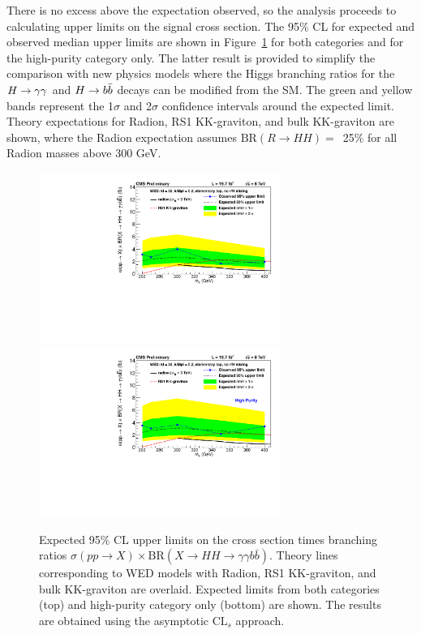 There is no excess above the expectation observed, so the analysis proceeds to calculating
upper limits on the signal cross section.
The 95\% CL for expected and observed median upper limits are shown in
Figure~\ref{fig:limits_lowmassres} for both categories and for the high-purity category only.
The latter result is provided to simplify the comparison with new physics models where
the Higgs branching ratios for the $H\to\gamma\gamma$ and $H\to b\bar{b}$ decays can be modified from the SM.
The green and yellow bands represent the 1$\sigma$ and 2$\sigma$
confidence intervals around the expected limit. Theory expectations for Radion, RS1 KK-graviton, and 
bulk KK-graviton are shown, where the Radion expectation assumes $\text{BR}(R\rightarrow HH) =$~25\%
for all Radion masses above 300 GeV.

\begin{figure}[ht]
 \begin{center}
   \includegraphics[width=0.7\textwidth]{figures/results/WP4_cutbased_low_all.pdf}
   \includegraphics[width=0.7\textwidth]{figures/results/WP4_cutbased_low_base_onecat.pdf}
 \end{center}
\caption{Expected 95\% CL upper limits on the cross section times branching ratios
$\sigma(pp\rightarrow X) \times \text{BR}( X \rightarrow HH \rightarrow \gamma\gamma b\bar{b})$.
Theory lines corresponding to WED models with Radion, RS1 KK-graviton, and bulk KK-graviton are
overlaid. Expected limits from both categories (top) and high-purity category only (bottom) are shown.
The results are obtained using the asymptotic $\text{CL}_s$ approach.}
\label{fig:limits_lowmassres}
\end{figure}

